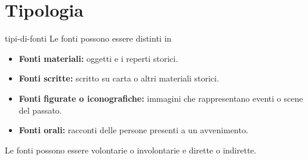 \documentclass[preview]{standalone}
\begin{document}
\genpage

\section{Tipologia }

\begin{snippet}{tipi-di-fonti}
    Le fonti possono essere distinti in
    \begin{itemize}
        \item \textbf{Fonti materiali:} oggetti e i reperti storici.
        \item \textbf{Fonti scritte:} scritto su carta o altri materiali storici.
        \item \textbf{Fonti figurate o iconografiche:} immagini che rappresentano eventi o scene del passato.
        \item \textbf{Fonti orali:} racconti delle persone presenti a un avvenimento.
    \end{itemize}

    Le fonti possono essere volontarie o involontarie e
    dirette o indirette.
\end{snippet}
\end{document}

